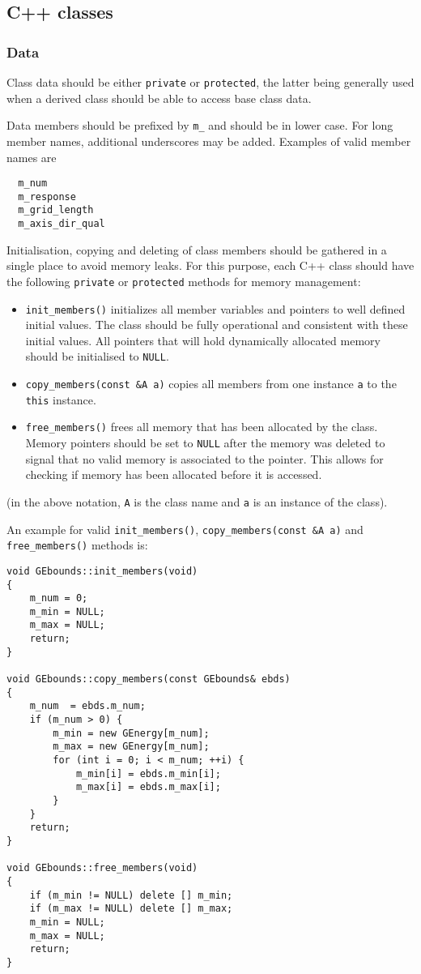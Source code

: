 \documentclass{article}[12pt,a4]
\begin{document}
\subsection{C++ classes}

\subsubsection{Data}

Class data should be either {\tt private} or {\tt protected}, the latter being generally used
when a derived class should be able to access base class data.

Data members should be prefixed by {\tt m\_} and should be in lower case.
For long member names, additional underscores may be added.
Examples of valid member names are
\begin{verbatim}
  m_num
  m_response
  m_grid_length
  m_axis_dir_qual
\end{verbatim}

Initialisation, copying and deleting of class members should be gathered in a single
place to avoid memory leaks.
For this purpose, each C++ class should have the following {\tt private} or {\tt protected}
methods for memory management:
\begin{itemize}
\item {\tt init\_members()} initializes all member variables and pointers to well defined
initial values. The class should be fully operational and consistent with these initial
values. All pointers that will hold dynamically allocated memory should be
initialised to {\tt NULL}.
\item {\tt copy\_members(const \&A a)} copies all members from one instance {\tt a}
to the {\tt this} instance.
\item {\tt free\_members()} frees all memory that has been allocated by the class.
Memory pointers should be set to {\tt NULL} after the memory was deleted to signal
that no valid memory is associated to the pointer.
This allows for checking if memory has been allocated before it is accessed.
\end{itemize}
(in the above notation, {\tt A} is the class name and {\tt a} is an instance of the class).

An example for valid {\tt init\_members()}, {\tt copy\_members(const \&A a)} and
{\tt free\_members()} methods is:
\begin{verbatim}
void GEbounds::init_members(void)
{
    m_num = 0;
    m_min = NULL;
    m_max = NULL;
    return;
}

void GEbounds::copy_members(const GEbounds& ebds)
{
    m_num  = ebds.m_num;
    if (m_num > 0) {
        m_min = new GEnergy[m_num];
        m_max = new GEnergy[m_num];
        for (int i = 0; i < m_num; ++i) {
            m_min[i] = ebds.m_min[i];
            m_max[i] = ebds.m_max[i];
        }
    }
    return;
}

void GEbounds::free_members(void)
{
    if (m_min != NULL) delete [] m_min;
    if (m_max != NULL) delete [] m_max;
    m_min = NULL;
    m_max = NULL;
    return;
}
\end{verbatim}
\end{document}

